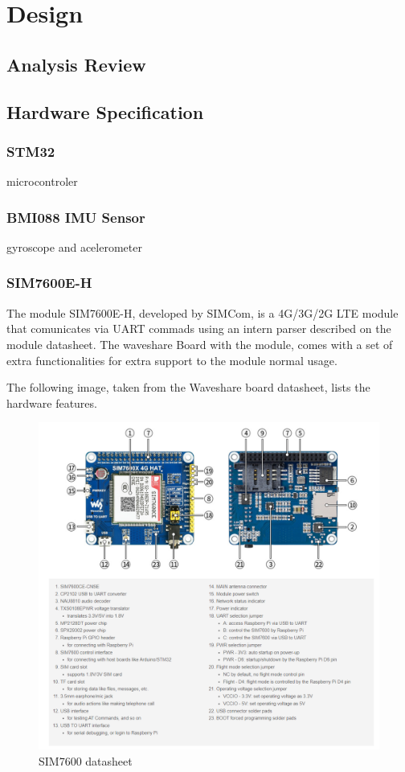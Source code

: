 
\chapter{Design}
\section{Analysis Review}
\section{Hardware Specification}
\subsection{STM32}
microcontroler
\subsection{BMI088 IMU Sensor}
gyroscope and acelerometer
\subsection{SIM7600E-H} 
The module SIM7600E-H, developed by SIMCom, is a 4G/3G/2G LTE module that comunicates via UART commads using an intern parser described on the module datasheet. 
The waveshare Board with the module, comes with a set of extra functionalities for extra support to the module normal usage.

The following image, taken from the Waveshare board datasheet, lists the hardware features.
\begin{figure}[H]%
    \centering
    \includegraphics[width=1\textwidth]{images/chapter/design/SIM7600_board.png}
    \caption{SIM7600 datasheet}
    \label{fig:SIM7600 datasheet}
\end{figure}

